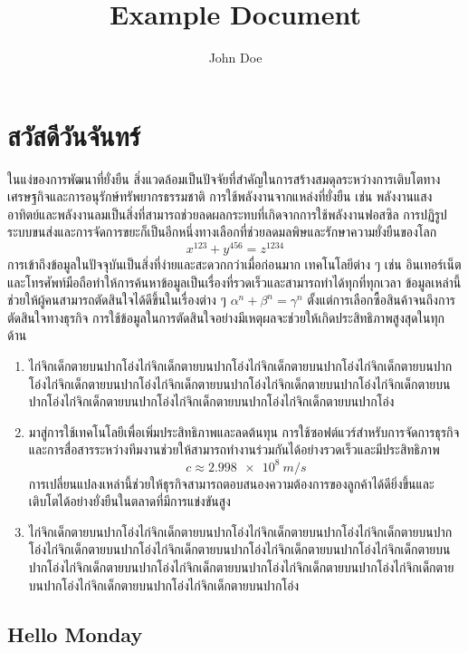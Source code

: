 \documentclass[11pt, oneside]{book}
\title{Example Document}
\author{John Doe}
\begin{document}
\maketitle
\pagestyle{fancy}

\chapter{สวัสดีวันจันทร์}

ในแง่ของการพัฒนาที่ยั่งยืน สิ่งแวดล้อมเป็นปัจจัยที่สำคัญในการสร้างสมดุลระหว่างการเติบโตทางเศรษฐกิจและการอนุรักษ์ทรัพยากรธรรมชาติ การใช้พลังงานจากแหล่งที่ยั่งยืน เช่น พลังงานแสงอาทิตย์และพลังงานลมเป็นสิ่งที่สามารถช่วยลดผลกระทบที่เกิดจากการใช้พลังงานฟอสซิล การปฏิรูประบบขนส่งและการจัดการขยะก็เป็นอีกหนึ่งทางเลือกที่ช่วยลดมลพิษและรักษาความยั่งยืนของโลก
\[
x^{123} + y^{456} = z^{1234}
\]
การเข้าถึงข้อมูลในปัจจุบันเป็นสิ่งที่ง่ายและสะดวกกว่าเมื่อก่อนมาก เทคโนโลยีต่าง ๆ เช่น อินเทอร์เน็ตและโทรศัพท์มือถือทำให้การค้นหาข้อมูลเป็นเรื่องที่รวดเร็วและสามารถทำได้ทุกที่ทุกเวลา ข้อมูลเหล่านี้ช่วยให้ผู้คนสามารถตัดสินใจได้ดีขึ้นในเรื่องต่าง ๆ  $\alpha^n + \beta^n = \gamma^n$ ตั้งแต่การเลือกซื้อสินค้าจนถึงการตัดสินใจทางธุรกิจ การใช้ข้อมูลในการตัดสินใจอย่างมีเหตุผลจะช่วยให้เกิดประสิทธิภาพสูงสุดในทุกด้าน
\begin{enumerate}
    \item ไก่จิกเด็กตายบนปากโอ่งไก่จิกเด็กตายบนปากโอ่งไก่จิกเด็กตายบนปากโอ่งไก่จิกเด็กตายบนปากโอ่งไก่จิกเด็กตายบนปากโอ่งไก่จิกเด็กตายบนปากโอ่งไก่จิกเด็กตายบนปากโอ่งไก่จิกเด็กตายบนปากโอ่งไก่จิกเด็กตายบนปากโอ่งไก่จิกเด็กตายบนปากโอ่งไก่จิกเด็กตายบนปากโอ่ง
    \item มาสู่การใช้เทคโนโลยีเพื่อเพิ่มประสิทธิภาพและลดต้นทุน การใช้ซอฟต์แวร์สำหรับการจัดการธุรกิจและการสื่อสารระหว่างทีมงานช่วยให้สามารถทำงานร่วมกันได้อย่างรวดเร็วและมีประสิทธิภาพ 
    \[
    c \approx \qty{2.998e8}{m/s}
    \]
    การเปลี่ยนแปลงเหล่านี้ช่วยให้ธุรกิจสามารถตอบสนองความต้องการของลูกค้าได้ดียิ่งขึ้นและเติบโตได้อย่างยั่งยืนในตลาดที่มีการแข่งขันสูง
    \item ไก่จิกเด็กตายบนปากโอ่งไก่จิกเด็กตายบนปากโอ่งไก่จิกเด็กตายบนปากโอ่งไก่จิกเด็กตายบนปากโอ่งไก่จิกเด็กตายบนปากโอ่งไก่จิกเด็กตายบนปากโอ่งไก่จิกเด็กตายบนปากโอ่งไก่จิกเด็กตายบนปากโอ่งไก่จิกเด็กตายบนปากโอ่งไก่จิกเด็กตายบนปากโอ่งไก่จิกเด็กตายบนปากโอ่งไก่จิกเด็กตายบนปากโอ่งไก่จิกเด็กตายบนปากโอ่งไก่จิกเด็กตายบนปากโอ่ง
\end{enumerate}

\section{Hello Monday}
\end{document}
